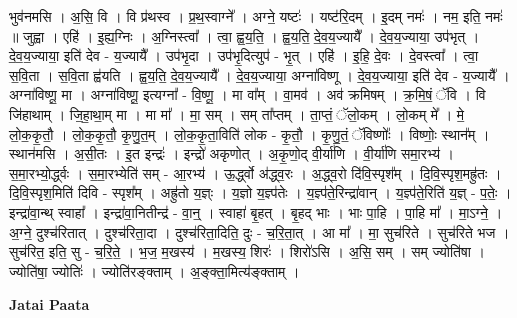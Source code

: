 \documentclass[17pt]{extarticle}
\begin{document}
भुव॑नमसि । अ॒सि॒ वि । वि प्र॑थस्व । प्र॒थ॒स्वाग्ने᳚ । अग्ने॒ यष्टः॑ । यष्ट॑रि॒दम् । इ॒दम् नमः॑ । नम॒ इति॒ नमः॑ ॥ जुह्वा । एहि॑ । इ॒ह्य॒ग्निः । अ॒ग्निस्त्वा᳚ । त्वा॒ ह्व॒य॒ति॒ । ह्व॒य॒ति॒ दे॒व॒य॒ज्यायै᳚ । दे॒व॒य॒ज्याया॒ उप॑भृत् । दे॒व॒य॒ज्याया॒ इति॑ देव - य॒ज्यायै᳚ । उप॑भृ॒दा । उप॑भृ॒दित्युप॑ - भृ॒त् । एहि॑ । इ॒हि॒ दे॒वः । दे॒वस्त्वा᳚ । त्वा॒ स॒वि॒ता । स॒वि॒ता ह्व॑यति । ह्व॒य॒ति॒ दे॒व॒य॒ज्यायै᳚ । दे॒व॒य॒ज्याया॒ अग्ना॑विष्णू । दे॒व॒य॒ज्याया॒ इति॑ देव - य॒ज्यायै᳚ । अग्ना॑विष्णू॒ मा । अग्ना॑विष्णू॒ इत्यग्ना᳚ - वि॒ष्णू॒ । मा वा᳚म् । वा॒मव॑ । अव॑ क्रमिषम् । क्र॒मि॒षं॒ ॅवि । वि जि॑हाथाम् । जि॒हा॒था॒म् मा । मा मा᳚ । मा॒ सम् । सम् ता᳚प्तम् । ता॒प्तं॒ ॅलो॒कम् । लो॒कम् मे᳚ । मे॒ लो॒क॒कृ॒तौ॒ । लो॒क॒कृ॒तौ॒ कृ॒णु॒त॒म् । लो॒क॒कृ॒ता॒विति॑ लोक - कृ॒तौ॒ । कृ॒णु॒तं॒ ॅविष्णोः᳚ । विष्णोः॒ स्थान᳚म् । स्थान॑मसि । अ॒सी॒तः । इ॒त इन्द्रः॑ । इन्द्रो॑ अकृणोत् । अ॒कृ॒णो॒द् वी॒र्या॑णि । वी॒र्या॑णि समा॒रभ्य॑ । स॒मा॒रभ्यो॒र्द्ध्वः । स॒मा॒रभ्येति॑ सम् - आ॒रभ्य॑ । ऊ॒र्द्ध्वो अ॑द्ध्व॒रः । अ॒द्ध्व॒रो दि॑वि॒स्पृश᳚म् । दि॒वि॒स्पृश॒मह्रु॑तः । दि॒वि॒स्पृश॒मिति॑ दिवि - स्पृश᳚म् । अह्रु॑तो य॒ज्ञ्ः । य॒ज्ञो य॒ज्ञ्प॑तेः । य॒ज्ञ्प॑ते॒रिन्द्रा॑वान् । य॒ज्ञ्प॑ते॒रिति॑ य॒ज्ञ् - प॒तेः॒ । इन्द्रा॑वा॒न्थ् स्वाहा᳚ । इन्द्रा॑वा॒नितीन्द्र॑ - वा॒न्॒ । स्वाहा॑ बृ॒हत् । बृ॒हद् भाः । भाः पा॒हि । पा॒हि मा᳚ । मा॒ऽग्ने॒ । अ॒ग्ने॒ दुश्च॑रितात् । दुश्च॑रिता॒दा । दुश्च॑रिता॒दिति॒ दुः - च॒रि॒ता॒त् । आ मा᳚ । मा॒ सुच॑रिते । सुच॑रिते भज । सुच॑रित॒ इति॒ सु - च॒रि॒ते॒ । भ॒ज॒ म॒खस्य॑ । म॒खस्य॒ शिरः॑ । शिरो॑ऽसि । अ॒सि॒ सम् । सम् ज्योति॑षा । ज्योति॑षा॒ ज्योतिः॑ । ज्योति॑रङ्‍क्ताम् । अ॒ङ्‍क्ता॒मित्य॑ङ्‍क्ताम् । \newline

\textbf{Jatai Paata} \newline
\end{document}
